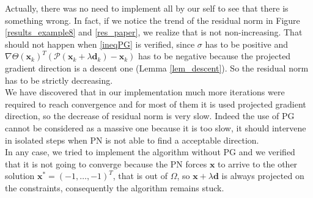 Actually, there was no need to implement all by our self to see that there is something wrong. In fact, if we notice the trend of the residual norm in Figure \ref{results_example8} and \ref{res_paper}, we realize that is not non-increasing. That should not happen when \eqref{ineqPG} is verified, since $ \sigma $ has to be positive and $\nabla \Theta(\textbf{x}_k)^T (\mathcal{P}(\textbf{x}_k + \lambda \textbf{d}_k)- \textbf{x}_k)  $ has to be negative because the projected gradient direction is a descent one (Lemma \ref{lem_descent}). So the residual norm has to be strictly decreasing. \\
We have discovered that in our implementation much more iterations were required to reach convergence and for most of them it is used projected gradient direction, so the decrease of residual norm is very slow. Indeed the use of PG cannot be considered as a massive one because it is too slow, it should intervene in isolated steps when PN is not able to find a acceptable direction. \\
In any case, we tried to implement the algorithm without PG and we verified that it is not going to converge because the PN forces $\textbf{x} $ to arrive to the other solution $ \textbf{x}^* = (-1, \dots, -1)^T$, that is out of $ \Omega $, so $ \textbf{x} + \lambda \textbf{d} $ is always projected on the constraints, consequently the algorithm remains stuck. 
